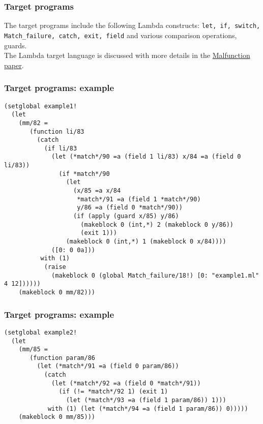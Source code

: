 \documentclass{beamer}
\begin{document}
\begin{frame}[fragile]
  \frametitle{Target programs}
  The target programs include the following Lambda constructs:
  \texttt{let, if, switch, Match\_failure, catch, exit, field} and
  various comparison operations, guards. \\
  The Lambda target language is discussed with more details in the \href{https://www.cl.cam.ac.uk/~sd601/papers/malfunction.pdf}{Malfunction paper}.
\end{frame}
\begin{frame}[fragile]
  \frametitle{Target programs: example}
  \begin{small}
    \hspace{-1em}
    \begin{minipage}{0.36\linewidth}
      \begin{lstlisting}
(setglobal example1!
  (let
    (mm/82 =
       (function li/83
         (catch
           (if li/83
             (let (*match*/90 =a (field 1 li/83) x/84 =a (field 0 li/83))
               (if *match*/90
                 (let
                   (x/85 =a x/84
                    *match*/91 =a (field 1 *match*/90)
                    y/86 =a (field 0 *match*/90))
                   (if (apply (guard x/85) y/86)
                     (makeblock 0 (int,*) 2 (makeblock 0 y/86))
                     (exit 1)))
                 (makeblock 0 (int,*) 1 (makeblock 0 x/84))))
             ([0: 0 0a]))
          with (1)
           (raise
             (makeblock 0 (global Match_failure/18!) [0: "example1.ml" 4 12])))))
    (makeblock 0 mm/82)))
      \end{lstlisting}
    \end{minipage}
  \end{small}
\end{frame}

\begin{frame}[fragile]
  \frametitle{Target programs: example} %
  \begin{small}
    \hspace{-1em}
    \begin{minipage}{0.36\linewidth}
      \begin{lstlisting}
(setglobal example2!
  (let
    (mm/85 =
       (function param/86
         (let (*match*/91 =a (field 0 param/86))
           (catch
             (let (*match*/92 =a (field 0 *match*/91))
               (if (!= *match*/92 1) (exit 1)
                 (let (*match*/93 =a (field 1 param/86)) 1)))
            with (1) (let (*match*/94 =a (field 1 param/86)) 0)))))
    (makeblock 0 mm/85)))
      \end{lstlisting}
    \end{minipage}
  \end{small}
\end{frame}
\end{document}
